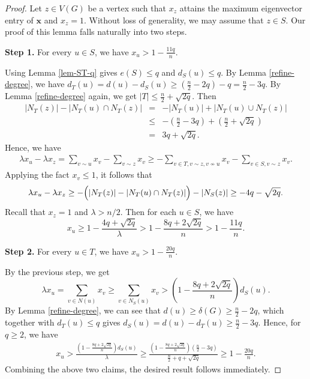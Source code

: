 \documentclass[11pt]{article}
\begin{document}
\begin{proof} 
Let $z\in V(G)$ be a vertex 
such that ${x}_z$ attains the maximum 
eigenvector entry of $\bm{x}$ and ${x}_z=1$. 
Without loss of generality, we may assume that $z\in S$.  
Our proof of this lemma falls naturally into two steps.  
\medskip 

{\bf Step 1.}   For every $u \in S$, 
we have ${x}_u > 1- \frac{11q}{n}$. 

\medskip 

 Using Lemma \ref{lem-ST-q} gives $e(S)\le q$ and  $d_S(u)\le q $. By Lemma \ref{refine-degree},  we have  
$d_T(u) = d(u)-d_S(u)  \ge ( \frac{n}{2}-2q )-q  = \frac{n}{2}-3q$. 
By Lemma \ref{refine-degree} again, we  get 
$|T|\le \frac{n}{2} + \sqrt{2q}$. Then 
\begin{eqnarray*}
 |N_T(z)| - |N_T(u)\cap N_T(z)|  
 &=& -|N_T(u)| + |N_T(u) \cup N_T(z)|  \\
& \le& - \left(\frac{n}{2} -3q \right) +  
\left(\frac{n}{2}  + \sqrt{2q} \right) \\
&=& 3q + \sqrt{2q} .
\end{eqnarray*}  
Hence, we have 
\begin{eqnarray*}
\lambda {x}_u-\lambda {x}_z 
= \sum_{v\sim u} {x}_v  - \sum_{v\sim z} {x}_v 
\ge  -\sum_{v\in T, v\sim z, v\not\sim u} {x}_v 
-\sum_{v\in S, v\sim z} {x}_v. 
\end{eqnarray*}
Applying the fact ${x}_v \le 1$, it follows that 
\begin{eqnarray*}
\lambda {x}_u-\lambda {x}_z  
\ge  -\Bigl( |N_T(z)| -|N_T(u)\cap N_T(z)| \Bigr) 
- |N_S(z)| 
\ge  - 4q -\sqrt{2q}. 
\end{eqnarray*}
Recall that ${x}_z=1$ 
and $\lambda > {n}/{2}$. Then for each $u\in S$, 
we have 
\begin{equation*}\label{verct1}
{x}_u\ge 1-\frac{4q + \sqrt{2q} }{\lambda }> 1-\frac{8q + 2\sqrt{2q} }{n} > 1-\frac{11q}{n}.
\end{equation*}

{\bf Step 2.}   
For every $u\in T$, we have ${x}_u> 1- \frac{20q}{n}$. 

\medskip 

By the previous step, we get 
 $$\lambda  {x}_u=\sum_{v\in N(u)} {x}_v\ge \sum_{v\in  N_S(u)} {x}_v 
 > \left(1-\frac{8q + 2\sqrt{2q} }{n} \right)d_S(u).$$ 
By  Lemma \ref{refine-degree}, we can see that 
$d(u)\ge \delta (G)\ge \frac{n}{2} - 2q$, 
which together with $d_T(u)\le q$ gives 
$ d_S(u)=d(u)- d_T(u)\ge  \frac{n}{2}-3q$.
 Hence, for $q\ge 2$, we have 
 \begin{eqnarray*}
 {x}_u >  \frac{(1-\frac{8q + 2\sqrt{2q} }{n})d_S(u)}{\lambda } 
 \ge  \frac{(1-\frac{8q + 2\sqrt{2q} }{n})(\frac{n}{2}-3q)}{
 \frac{n}{2}+q + \sqrt{2q}} 
 \ge 1- \frac{20q}{n}.
 \end{eqnarray*} 
Combining the above two claims, 
 the desired result follows immediately.
\end{proof}
\end{document}
